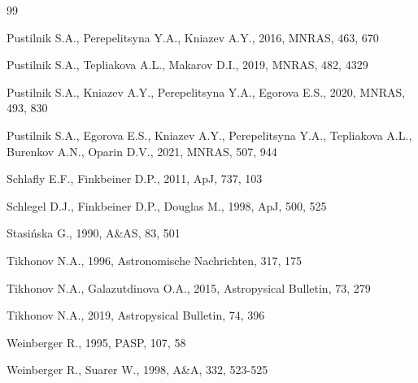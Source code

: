\documentclass[useAMS,usenatbib]{mn2e}
\begin{document}
\begin{thebibliography}{99}

 Pustilnik S.A., Perepelitsyna Y.A., Kniazev A.Y., 2016, MNRAS, 463, 670

   Pustilnik S.A., Tepliakova A.L., Makarov D.I., 2019, MNRAS, 482, 4329

Pustilnik S.A., Kniazev A.Y., Perepelitsyna Y.A., Egorova E.S.,
  2020, MNRAS, 493, 830

Pustilnik S.A., Egorova E.S., Kniazev A.Y., Perepelitsyna Y.A., Tepliakova
   A.L., Burenkov A.N., Oparin D.V., 2021, MNRAS, 507, 944

  Schlafly E.F., Finkbeiner D.P., 2011, ApJ, 737, 103 %

   Schlegel D.J., Finkbeiner D.P., Douglas M., 1998, ApJ, 500, 525


     Stasi\'nska G., 1990, A\&AS, 83, 501


      Tikhonov N.A., 1996, Astronomische Nachrichten, 317, 175

      Tikhonov N.A., Galazutdinova O.A., 2015, Astropysical Bulletin, 73, 279

      Tikhonov N.A., 2019, Astropysical Bulletin, 74, 396

 Weinberger R., 1995, PASP, 107, 58

Weinberger R., Suarer W., 1998, A\&A, 332, 523-525

\end{thebibliography}


\label{lastpage}
\end{document}
